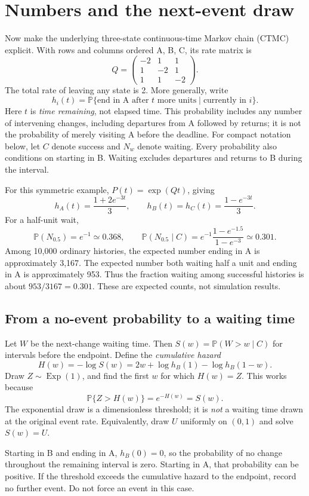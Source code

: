 \documentclass[11pt,a4paper]{article}
\newcommand{\Prob}{\mathbb{P}}
\begin{document}
\section{Numbers and the next-event draw}
Now make the underlying three-state continuous-time Markov chain (CTMC)
explicit. With rows and columns ordered A, B, C, its rate matrix is
\[
Q=\begin{pmatrix}-2&1&1\\1&-2&1\\1&1&-2\end{pmatrix}.
\]
The total rate of leaving any state is 2. More generally, write
\[
h_i(t)=\Prob\{\text{end in A after }t\text{ more units}\mid\text{currently in }i\}.
\]
Here \(t\) is \emph{time remaining}, not elapsed time. This probability includes
any number of intervening changes, including departures from A followed by returns;
it is not the probability of merely visiting A before the deadline.
For compact notation below, let \(C\) denote success and \(N_w\) denote waiting.
Every probability also conditions on starting in B. Waiting excludes departures
and returns to B during the interval.

For this symmetric example, \(P(t)=\exp(Qt)\), giving
\[
h_A(t)=\frac{1+2e^{-3t}}{3},\qquad
h_B(t)=h_C(t)=\frac{1-e^{-3t}}{3}.
\]
For a half-unit wait,
\[
\Prob(N_{0.5})=e^{-1}\simeq0.368,\qquad
\Prob(N_{0.5}\mid C)
=e^{-1}\frac{1-e^{-1.5}}{1-e^{-3}}\simeq0.301.
\]
Among 10,000 ordinary histories, the expected number ending in A is approximately
3,167. The expected number both waiting half a unit and ending in A is approximately
953. Thus the fraction waiting among successful histories is about
\(953/3167=0.301\). These are expected counts, not simulation results.

\subsection{From a no-event probability to a waiting time}
Let \(W\) be the next-change waiting time. Then \(S(w)=\Prob(W>w\mid C)\)
for intervals before the endpoint. Define the \emph{cumulative hazard}
\[
H(w)=-\log S(w)=2w+\log h_B(1)-\log h_B(1-w).
\]
Draw \(Z\sim\operatorname{Exp}(1)\), and find the first \(w\) for which
\(H(w)=Z\). This works because
\[
\Prob\{Z>H(w)\}=e^{-H(w)}=S(w).
\]
The exponential draw is a dimensionless threshold; it is \emph{not} a waiting
time drawn at the original event rate. Equivalently, draw \(U\) uniformly on
\((0,1)\) and solve \(S(w)=U\).

Starting in B and ending in A, \(h_B(0)=0\), so the probability of no change
throughout the remaining interval is zero. Starting in A, that probability can
be positive. If the threshold exceeds the cumulative hazard to the endpoint,
record no further event. Do not force an event in this case.
\end{document}
